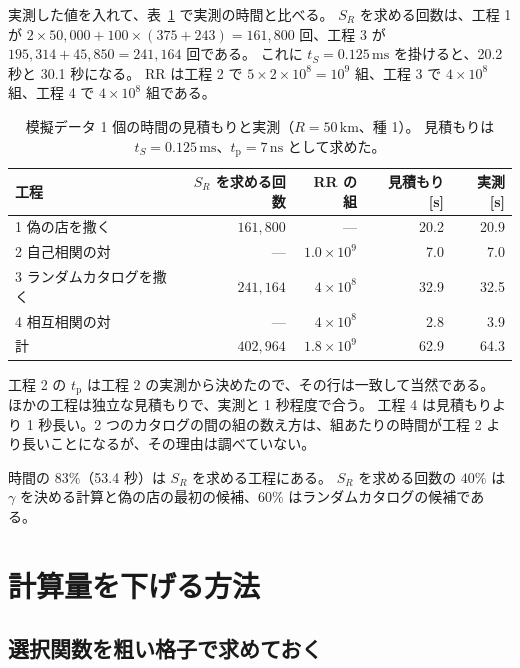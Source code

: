 \documentclass[a4paper,11pt]{ltjsarticle}
\begin{document}
実測した値を入れて、表~\ref{tab:estimate} で実測の時間と比べる。
$S_R$ を求める回数は、工程 1 が $2 \times 50{,}000 + 100 \times (375 + 243) = 161{,}800$ 回、工程 3 が $195{,}314 + 45{,}850 = 241{,}164$ 回である。
これに $t_S = 0.125\,\mathrm{ms}$ を掛けると、20.2 秒と 30.1 秒になる。
RR は工程 2 で $5 \times 2 \times 10^8 = 10^9$ 組、工程 3 で $4 \times 10^8$ 組、工程 4 で $4 \times 10^8$ 組である。
\begin{table}[t]
  \centering
  \caption{模擬データ 1 個の時間の見積もりと実測（$R = 50\,\mathrm{km}$、種 1）。
    見積もりは $t_S = 0.125\,\mathrm{ms}$、$t_{\mathrm{p}} = 7\,\mathrm{ns}$ として求めた。}
  \label{tab:estimate}
  \small
  \begin{tabular}{lrrrr}
    \toprule
    工程 & $S_R$ を求める回数 & RR の組 & 見積もり [s] & 実測 [s] \\
    \midrule
    1 偽の店を撒く & $161{,}800$ & --- & 20.2 & 20.9 \\
    2 自己相関の対 & --- & $1.0 \times 10^9$ & 7.0 & 7.0 \\
    3 ランダムカタログを撒く & $241{,}164$ & $4 \times 10^8$ & 32.9 & 32.5 \\
    4 相互相関の対 & --- & $4 \times 10^8$ & 2.8 & 3.9 \\
    \midrule
    計 & $402{,}964$ & $1.8 \times 10^9$ & 62.9 & 64.3 \\
    \bottomrule
  \end{tabular}
\end{table}
工程 2 の $t_{\mathrm{p}}$ は工程 2 の実測から決めたので、その行は一致して当然である。
ほかの工程は独立な見積もりで、実測と 1 秒程度で合う。
工程 4 は見積もりより 1 秒長い。2 つのカタログの間の組の数え方は、組あたりの時間が工程 2 より長いことになるが、その理由は調べていない。

時間の $83\%$（53.4 秒）は $S_R$ を求める工程にある。
$S_R$ を求める回数の $40\%$ は $\gamma$ を決める計算と偽の店の最初の候補、$60\%$ はランダムカタログの候補である。

\section{計算量を下げる方法}
\label{sec:faster}

\subsection{選択関数を粗い格子で求めておく}
\end{document}
